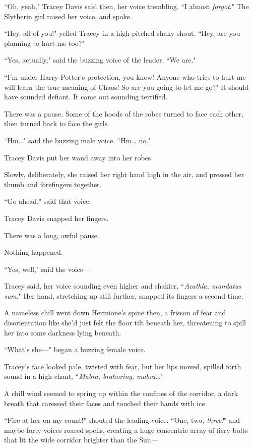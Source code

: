 ``Oh, yeah," Tracey Davis said then, her voice trembling. ``I almost \emph{forgot}." The Slytherin girl raised her voice, and spoke.

``Hey, all of you!" yelled Tracey in a high-pitched shaky shout. ``Hey, are you planning to hurt me too?"

``Yes, actually," said the buzzing voice of the leader. ``We are."

``I'm under Harry Potter's protection, you know! Anyone who tries to hurt me will learn the true meaning of Chaos! So are you going to let me go?" It should have sounded defiant. It came out sounding terrified.

There was a pause. Some of the hoods of the robes turned to face each other, then turned back to face the girls.

``Hm{\ldots}" said the buzzing male voice. ``Hm{\ldots} no."

Tracey Davis put her wand away into her robes.

Slowly, deliberately, she raised her right hand high in the air, and pressed her thumb and forefingers together.

``Go ahead," said that voice.

Tracey Davis snapped her fingers.

There was a long, awful pause.

Nothing happened.

``Yes, well," said the voice—

Tracey said, her voice sounding even higher and shakier, ``\emph{Acathla, mundatus sum}." Her hand, stretching up still further, snapped its fingers a second time.

A nameless chill went down Hermione's spine then, a frisson of fear and disorientation like she'd just felt the floor tilt beneath her, threatening to spill her into some darkness lying beneath.

``What's she—" began a buzzing female voice.

Tracey's face looked pale, twisted with fear, but her lips moved, spilled forth sound in a high chant, ``\emph{Mabra, brahoring, mabra{\ldots}}"

A chill wind seemed to spring up within the confines of the corridor, a dark breath that caressed their faces and touched their hands with ice.

``Fire at her on my count!" shouted the leading voice. ``One, two\emph{, three!}" and maybe-forty voices roared spells, creating a huge concentric array of fiery bolts that lit the wide corridor brighter than the Sun—

